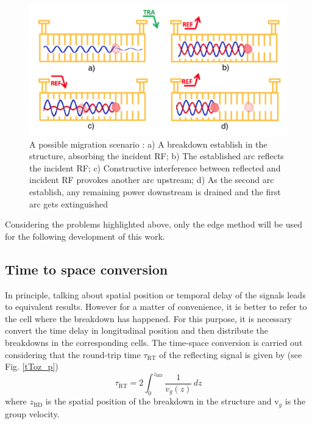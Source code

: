 \begin{figure}[h]
\centering 
\includegraphics[scale=0.3]{pictures/migration_scenario}
\caption{A possible migration scenario \cite{Degiovanni:migration}: a) A breakdown establish in the structure, absorbing the incident RF; b) The established arc reflects the incident RF; c) Constructive interference between reflected and incident RF provokes another arc upstream; d) As the second arc establish, any remaining power downstream is drained and the first arc gets extinguished}
\label{mig_sc}
\end{figure}


Considering the problems highlighted above, only the edge method will be used for the following development of this work.




\subsection[Time to space conversion]{Time to space conversion}

In principle, talking about spatial position or temporal delay of the signals leads to equivalent results. However for a matter of convenience, it is better to refer to the cell where the breakdown has happened. For this purpose, it is necessary convert the time delay in longitudinal position and then distribute the breakdowns in the corresponding cells. The time-space conversion is carried out considering that the round-trip time $\tau_{\text{RT}}$  of the reflecting signal is given by (see Fig. \ref{tToz_p})
\begin{equation}
\tau_{\text{RT}} = 2 \int_0^{z_{\text{BD}}} \frac{1}{v_g (z)} \, dz
\label{tRT}
\end{equation}
where $z_{\text{BD}}$ is the spatial position of the breakdown in the structure and v$_g$ is the group velocity.

